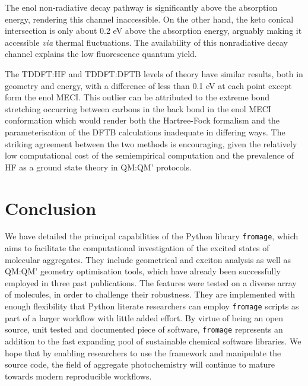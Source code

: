 The enol non-radiative decay pathway is significantly above the absorption energy, rendering this channel inaccessible. On the other hand, the keto conical intersection is only about 0.2 eV above the absorption energy, arguably making it accessible \textit{via} thermal fluctuations. The availability of this nonradiative decay channel explains the low fluorescence quantum yield.

The TDDFT:HF and TDDFT:DFTB levels of theory have similar results, both in geometry and energy, with a difference of less than 0.1 eV at each point except form the enol MECI. This outlier can be attributed to the extreme bond stretching occurring between carbons in the back bond in the enol MECI conformation which would render both the Hartree-Fock formalism and the parameterisation of the DFTB calculations inadequate in differing ways. The striking agreement between the two methods is encouraging, given the relatively low computational cost of the semiempirical computation and the prevalence of HF as a ground state theory in QM:QM' protocols.\cite{Presti2014,Presti2016,Presti2016a,Presti2017}





\section{Conclusion}
We have detailed the principal capabilities of the Python library \texttt{fromage}, which aims to facilitate the computational investigation of the excited states of molecular aggregates. They include geometrical and exciton analysis as well as QM:QM' geometry optimisation tools, which have already been successfully employed in three past publications.\cite{Rivera2019,Stojanovic2019,Dommett2019} The features were tested on a diverse array of molecules, in order to challenge their robustness. They are implemented with enough flexibility that Python literate researchers can employ \texttt{fromage} scripts as part of a larger workflow with little added effort. By virtue of being an open source, unit tested and documented piece of software, \texttt{fromage} represents an addition to the fast expanding pool of sustainable chemical software libraries. We hope that by enabling researchers to use the framework and manipulate the source code, the field of aggregate photochemistry will continue to mature towards modern reproducible workflows.